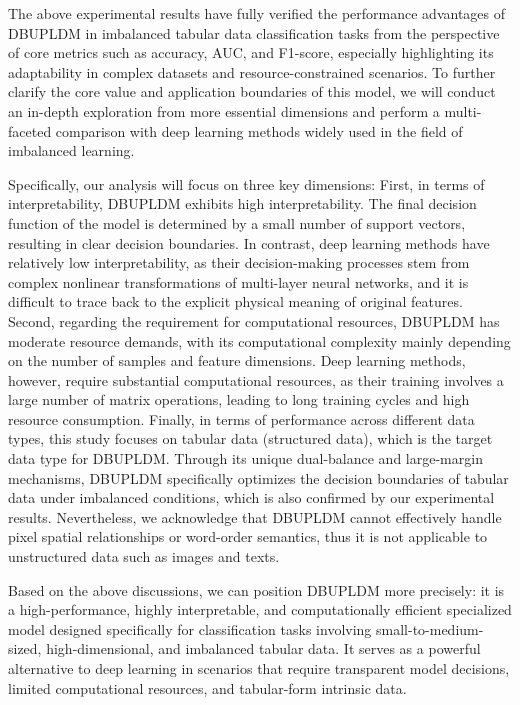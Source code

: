 \documentclass[a4paper]{cas-sc}
\begin{document}
{\color{orange}The above experimental results have fully verified the performance advantages of DBUPLDM in imbalanced tabular data classification tasks from the perspective of core metrics such as accuracy, AUC, and F1-score, especially highlighting its adaptability in complex datasets and resource-constrained scenarios. To further clarify the core value and application boundaries of this model, we will conduct an in-depth exploration from more essential dimensions and perform a multi-faceted comparison with deep learning methods widely used in the field of imbalanced learning.

Specifically, our analysis will focus on three key dimensions: First, in terms of interpretability, DBUPLDM exhibits high interpretability. The final decision function of the model is determined by a small number of support vectors, resulting in clear decision boundaries. In contrast, deep learning methods have relatively low interpretability, as their decision-making processes stem from complex nonlinear transformations of multi-layer neural networks, and it is difficult to trace back to the explicit physical meaning of original features. Second, regarding the requirement for computational resources, DBUPLDM has moderate resource demands, with its computational complexity mainly depending on the number of samples and feature dimensions. Deep learning methods, however, require substantial computational resources, as their training involves a large number of matrix operations, leading to long training cycles and high resource consumption. Finally, in terms of performance across different data types, this study focuses on tabular data (structured data), which is the target data type for DBUPLDM. Through its unique dual-balance and large-margin mechanisms, DBUPLDM specifically optimizes the decision boundaries of tabular data under imbalanced conditions, which is also confirmed by our experimental results. Nevertheless, we acknowledge that DBUPLDM cannot effectively handle pixel spatial relationships or word-order semantics, thus it is not applicable to unstructured data such as images and texts.

Based on the above discussions, we can position DBUPLDM more precisely: it is a high-performance, highly interpretable, and computationally efficient specialized model designed specifically for classification tasks involving small-to-medium-sized, high-dimensional, and imbalanced tabular data. It serves as a powerful alternative to deep learning in scenarios that require transparent model decisions, limited computational resources, and tabular-form intrinsic data.}
\end{document}
